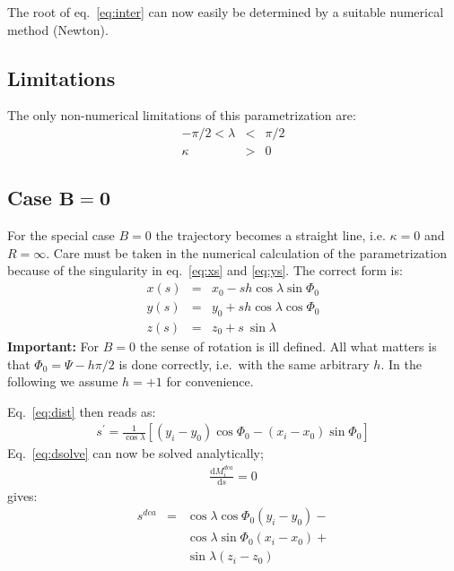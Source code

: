 \documentclass[twoside]{article}
\begin{document}
The root of eq.~\ref{eq:inter} can now easily be determined by a
suitable numerical method (Newton).

\subsection{Limitations}
\label{sec:Limitations}
The only non-numerical limitations of this parametrization are:
\begin{eqnarray}
    -\pi/2 < \lambda  & < & \pi/2 \\
    \kappa & > & 0
\end{eqnarray}

\subsection{Case $\mathbf{B = 0}$}

For the special case $B = 0$ the trajectory becomes a straight line,
i.e. $\kappa = 0$ and $R = \infty$.  Care must be taken in the numerical
calculation of the parametrization because of the singularity in
eq.~\ref{eq:xs} and \ref{eq:ys}. The correct form is:
\begin{eqnarray}
    x(s) & = & x_0 - s h \cos\lambda \sin\Phi_0 \\
    y(s) & = & y_0 + s h \cos\lambda \cos\Phi_0 \\
    z(s) & = & z_0 + s\ \sin\lambda
\end{eqnarray}
\textbf{Important:} For $B = 0$ the sense of rotation is ill defined. All what matters
is that $\Phi_0 = \Psi - h \pi/2$ is done correctly, i.e.~with the same arbitrary $h$. 
In the following we assume $h = +1$ for convenience.

Eq.~\ref{eq:dist} then reads as:
\begin{eqnarray}
  s^\prime = \frac{1}{\cos\lambda} \left[(y_i-y_0)\cos\Phi_0 - (x_i-x_0) \sin\Phi_0 \right]
\end{eqnarray}
Eq.~\ref{eq:dsolve} can now be solved analytically;
\begin{eqnarray}
\frac{\mathrm{d}M_i^{dca}}{\mathrm{d}s} = 0
\end{eqnarray}
gives:
\begin{eqnarray}
s^{dca}   & = & \cos\lambda \cos\Phi_0 (y_i-y_0) - \nonumber \\
          &   & \cos\lambda \sin\Phi_0 (x_i-x_0) + \nonumber \\
          &   & \sin\lambda (z_i-z_0)
\end{eqnarray}
\end{document}
